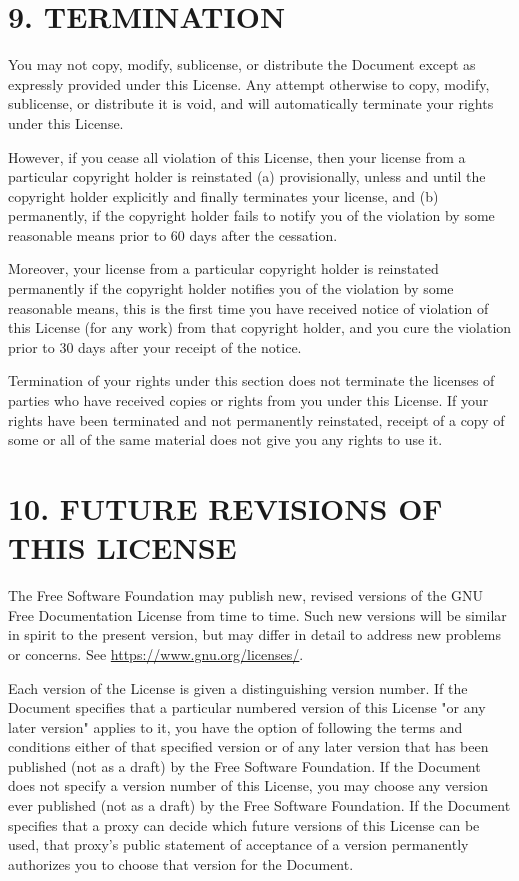 \section{9. TERMINATION}
You may not copy, modify, sublicense, or distribute the Document except as expressly provided under this License. Any attempt otherwise to copy, modify, sublicense, or distribute it is void, and will automatically terminate your rights under this License.\par
However, if you cease all violation of this License, then your license from a particular copyright holder is reinstated (a) provisionally, unless and until the copyright holder explicitly and finally terminates your license, and (b) permanently, if the copyright holder fails to notify you of the violation by some reasonable means prior to 60 days after the cessation.\par
Moreover, your license from a particular copyright holder is reinstated permanently if the copyright holder notifies you of the violation by some reasonable means, this is the first time you have received notice of violation of this License (for any work) from that copyright holder, and you cure the violation prior to 30 days after your receipt of the notice.\par
Termination of your rights under this section does not terminate the licenses of parties who have received copies or rights from you under this License. If your rights have been terminated and not permanently reinstated, receipt of a copy of some or all of the same material does not give you any rights to use it.
\section{10. FUTURE REVISIONS OF THIS LICENSE}
The Free Software Foundation may publish new, revised versions of the GNU Free Documentation License from time to time. Such new versions will be similar in spirit to the present version, but may differ in detail to address new problems or concerns. See \url{https://www.gnu.org/licenses/}.\par
Each version of the License is given a distinguishing version number. If the Document specifies that a particular numbered version of this License "or any later version" applies to it, you have the option of following the terms and conditions either of that specified version or of any later version that has been published (not as a draft) by the Free Software Foundation. If the Document does not specify a version number of this License, you may choose any version ever published (not as a draft) by the Free Software Foundation. If the Document specifies that a proxy can decide which future versions of this License can be used, that proxy's public statement of acceptance of a version permanently authorizes you to choose that version for the Document.
